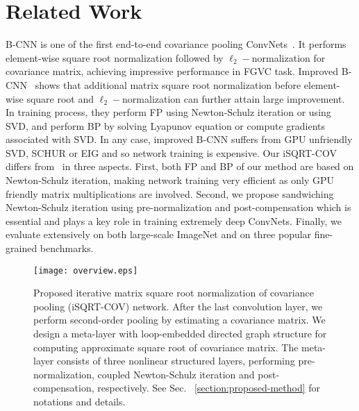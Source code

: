\documentclass[10pt,twocolumn,letterpaper]{article}
\begin{document}
\section{Related Work}\label{section:related-work}

B-CNN is one of the first end-to-end covariance  pooling ConvNets~\cite{lin2015bilinear,Ionescu_2015_ICCV}. It performs element-wise  square root normalization followed by $\ell_{2}-$normalization for covariance matrix, achieving impressive performance in FGVC task. Improved B-CNN~\cite{lin2017improved} shows that additional matrix square root normalization before element-wise square root and $\ell_{2}-$normalization  can further attain  large  improvement. In training process, they perform FP using Newton-Schulz iteration  or using SVD, and perform BP by solving Lyapunov equation or compute gradients associated with SVD. In any  case, improved B-CNN suffers from GPU unfriendly  SVD, SCHUR or EIG and so network training is expensive. Our iSQRT-COV differs from~\cite{lin2017improved} in three aspects. First, both FP and BP of our method are based on Newton-Schulz iteration, making network training very efficient as only GPU friendly matrix multiplications are involved. Second, we propose sandwiching    Newton-Schulz iteration using  pre-normalization  and post-compensation which is essential and plays a key role in training extremely  deep ConvNets. Finally, we evaluate extensively on both large-scale ImageNet and  on three popular fine-grained benchmarks. 

\begin{figure*}[t]
\begin{center}
   \texttt{[image: overview.eps]}
\end{center}
\caption{Proposed iterative matrix square root normalization of covariance pooling  (iSQRT-COV) network. After the last convolution layer, we perform second-order pooling by estimating a covariance matrix. We design a meta-layer with loop-embedded directed graph structure for computing approximate square root of covariance matrix. The meta-layer  consists of  three  nonlinear structured layers, performing pre-normalization, coupled  Newton-Schulz iteration and post-compensation, respectively.  See Sec. ~\ref{section:proposed-method} for  notations and  details.}
\label{fig:overview}
\end{figure*}
\end{document}
